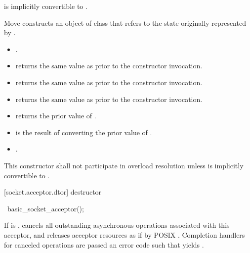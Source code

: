 \begin{itemdescr}
\pnum
\requires {} is implicitly convertible to .

\pnum
\effects Move constructs an object of class  that refers to the state originally represented by .

\pnum
\postconditions 
\begin{itemize}
\item
{}.
\item
{} returns the same value as  prior to the constructor invocation.
\item
{} returns the same value as  prior to the constructor invocation.
\item
{} returns the same value as  prior to the constructor invocation.
\item
{} returns the prior value of .
\item
{} is the result of converting the prior value of .
\item
{}.
\end{itemize}

\pnum
\remarks This constructor shall not participate in overload resolution unless  is implicitly convertible to .
\end{itemdescr}



[socket.acceptor.dtor]{ destructor}

\begin{itemdecl}
~basic_socket_acceptor();
\end{itemdecl}

\begin{itemdescr}
\pnum
\effects If  is , cancels all outstanding asynchronous operations associated with this acceptor, and releases acceptor resources as if by POSIX . Completion handlers for canceled operations are passed an error code  such that  yields .
\end{itemdescr}




